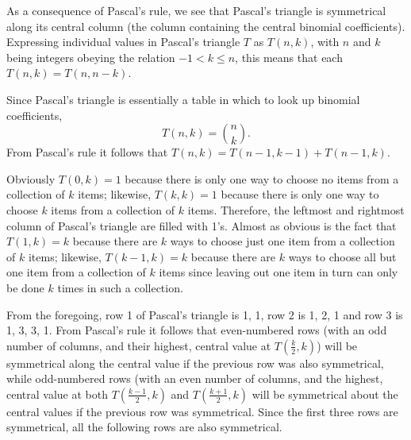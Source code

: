\documentclass[12pt]{article}
\begin{document}
As a consequence of Pascal's rule, we see that Pascal's triangle is symmetrical along its central column (the column containing the central binomial coefficients). Expressing individual values in Pascal's triangle $T$ as $T(n, k)$, with $n$ and $k$ being integers obeying the relation $-1 < k \leq n$, this means that each $T(n, k) = T(n, n - k)$.

Since Pascal's triangle is essentially a table in which to look up binomial coefficients, $$T(n, k) = \binom{n}{k}.$$ From Pascal's rule it follows that $T(n, k) = T(n - 1, k - 1) + T(n - 1, k)$.

Obviously $T(0, k) = 1$ because there is only one way to choose no items from a collection of $k$ items; likewise, $T(k, k) = 1$ because there is only one way to choose $k$ items from a collection of $k$ items. Therefore, the leftmost and rightmost column of Pascal's triangle are filled with 1's. Almost as obvious is the fact that $T(1, k) = k$ because there are $k$ ways to choose just one item from a collection of $k$ items; likewise, $T(k - 1, k) = k$ because there are $k$ ways to choose all but one item from a collection of $k$ items since leaving out one item in turn can only be done $k$ times in such a collection.

From the foregoing, row 1 of Pascal's triangle is {1, 1}, row 2 is {1, 2, 1} and row 3 is {1, 3, 3, 1}. From Pascal's rule it follows that even-numbered rows (with an odd number of columns, and their highest, central value at $T(\frac{k}{2}, k)$) will be symmetrical along the central value if the previous row was also symmetrical, while odd-numbered rows (with an even number of columns, and the highest, central value at both $T(\frac{k - 1}{2}, k)$ and $T(\frac{k + 1}{2}, k)$ will be symmetrical about the central values if the previous row was symmetrical. Since the first three rows are symmetrical, all the following rows are also symmetrical.
\end{document}
